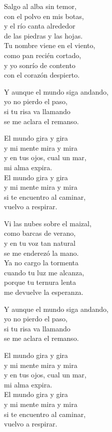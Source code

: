 \begin{lyrics}
Salgo al alba sin temor,\\
con el polvo en mis botas,\\
y el río canta alrededor\\
de las piedras y las hojas.\\
Tu nombre viene en el viento,\\
como pan recién cortado,\\
y yo sonrío de contento\\
con el corazón despierto.

Y aunque el mundo siga andando,\\
yo no pierdo el paso,\\
si tu risa va llamando\\
se me aclara el remanso.

El mundo gira y gira\\
y mi mente mira y mira\\
y en tus ojos, cual un mar,\\
mi alma expira.\\
El mundo gira y gira\\
y mi mente mira y mira\\
si te encuentro al caminar,\\
vuelvo a respirar.

Vi las nubes sobre el maizal,\\
como barcas de verano,\\
y en tu voz tan natural\\
se me enderezó la mano.\\
Ya no cargo la tormenta\\
cuando tu luz me alcanza,\\
porque tu ternura lenta\\
me devuelve la esperanza.

Y aunque el mundo siga andando,\\
yo no pierdo el paso,\\
si tu risa va llamando\\
se me aclara el remanso.

El mundo gira y gira\\
y mi mente mira y mira\\
y en tus ojos, cual un mar,\\
mi alma expira.\\
El mundo gira y gira\\
y mi mente mira y mira\\
si te encuentro al caminar,\\
vuelvo a respirar.


\end{lyrics}
